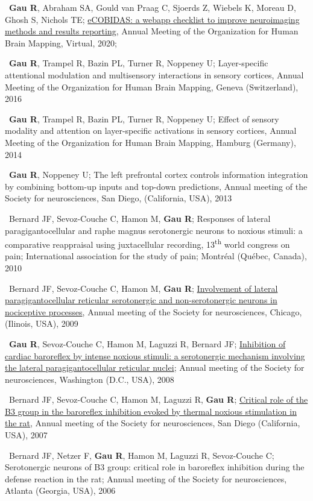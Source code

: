 \textbullet~\textbf{Gau R}, Abraham SA, Gould van Praag C, Sjoerds Z, Wiebels K, Moreau D, Ghosh S, Nichols TE;
\href{https://osf.io/k8pe6/}{eCOBIDAS: a webapp checklist to improve neuroimaging methods and results reporting},
Annual Meeting of the Organization for Human Brain Mapping, Virtual,
2020;

\textbullet~\textbf{Gau R}, Trampel R, Bazin PL, Turner R, Noppeney U;
Layer-specific attentional modulation and multisensory interactions in sensory cortices,
Annual Meeting of the Organization for Human Brain Mapping, Geneva (Switzerland),
2016
\newline
{}

\textbullet~\textbf{Gau R}, Trampel R, Bazin PL, Turner R, Noppeney U;
Effect of sensory modality and attention on layer-specific activations in sensory cortices,
Annual Meeting of the Organization for Human Brain Mapping, Hamburg (Germany),
2014
\newline
{}

\textbullet~\textbf{Gau R}, Noppeney U; The left prefrontal cortex controls information integration by combining bottom-up inputs and top-down predictions,
Annual meeting of the Society for neurosciences,
San Diego, (California, USA),
2013
\newline
{}

\textbullet~Bernard JF, Sevoz-Couche C, Hamon M, \textbf{Gau R}; Responses of lateral paragigantocellular and raphe magnus serotonergic neurons to noxious stimuli: a comparative reappraisal using juxtacellular recording,
13\textsuperscript{th} world congress on pain; International association for the study of pain;
Montréal (Québec, Canada),
2010

\textbullet~Bernard JF, Sevoz-Couche C, Hamon M, \textbf{Gau R}; \href{https://osf.io/efqub/}{Involvement of lateral paragigantocellular reticular serotonergic and non-serotonergic neurons in nociceptive processes},
Annual meeting of the Society for neurosciences,
Chicago, (Ilinois, USA),
2009

\textbullet~\textbf{Gau R}, Sevoz-Couche C, Hamon M, Laguzzi R, Bernard JF;
\href{https://osf.io/hxkgv/}{Inhibition of cardiac baroreflex by intense noxious stimuli: a serotonergic mechanism involving the lateral paragigantocellular reticular nuclei};
Annual meeting of the Society for neurosciences,
Washington (D.C., USA),
2008

\textbullet~Bernard JF, Sevoz-Couche C, Hamon M, Laguzzi R, \textbf{Gau R};
\href{https://osf.io/4rjst/}{Critical role of the B3 group in the baroreflex inhibition evoked by thermal noxious stimulation in the rat},
Annual meeting of the Society for neurosciences,
San Diego (California, USA),
2007

\textbullet~Bernard JF, Netzer F, \textbf{Gau R}, Hamon M, Laguzzi R, Sevoz-Couche C;
Serotonergic neurons of B3 group: critical role in baroreflex inhibition during the defense reaction in the rat;
Annual meeting of the Society for neurosciences,
Atlanta (Georgia, USA),
2006
